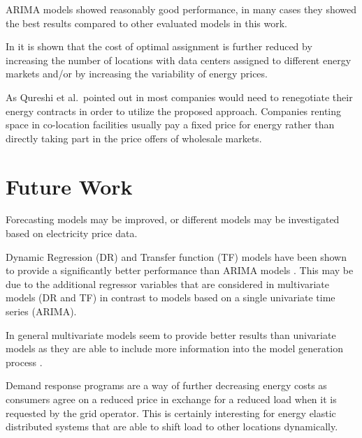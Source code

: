 




ARIMA models showed reasonably good performance, in many cases they showed the best results compared to other evaluated models in this work. 





In \cite{de2013study} it is shown that the cost of optimal assignment is further reduced by increasing the number of locations with data centers assigned to different energy markets and/or by increasing the variability of energy prices. 

As Qureshi et al.~pointed out in \cite{qureshi2009cutting} most companies would need to renegotiate their energy contracts in order to utilize the proposed approach. Companies renting space in co-location facilities usually pay a fixed price for energy rather than directly taking part in the price offers of wholesale markets. 


\section{Future Work}


Forecasting models may be improved, or different models may be investigated based on electricity price data. 

Dynamic Regression (DR) and Transfer function (TF) models have been shown to provide a significantly better performance than ARIMA models \cite{aggarwal2009electricity,weron2005forecasting}. This may be due to the additional regressor variables that are considered in multivariate models (DR and TF) in contrast to models based on a single univariate time series (ARIMA). 

In general multivariate models seem to provide better results than univariate models as they are able to include more information into the model generation process \cite{weron2005forecasting}. 

Demand response programs are a way of further decreasing energy costs as consumers agree on a reduced price in exchange for a reduced load when it is requested by the grid operator\cite{albadi2008summary}. This is certainly interesting for energy elastic distributed systems that are able to shift load to other locations dynamically. 

